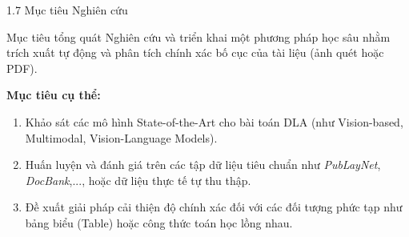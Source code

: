 \documentclass[aspectratio=1610,8pt]{beamer}
\begin{document}

\begin{frame}{1.7 \; Mục tiêu Nghiên cứu}
    \begin{block}{Mục tiêu tổng quát}
        Nghiên cứu và triển khai một phương pháp học sâu nhằm trích xuất tự động và phân tích chính xác bố cục của tài liệu (ảnh quét hoặc PDF).
    \end{block}

    \vspace{0.2cm}
    \textbf{Mục tiêu cụ thể:}
    \begin{enumerate}
        \item Khảo sát các mô hình State-of-the-Art cho bài toán DLA (như Vision-based, Multimodal, Vision-Language Models).
        \item Huấn luyện và đánh giá trên các tập dữ liệu tiêu chuẩn như \textit{PubLayNet}, \textit{DocBank},...,  hoặc dữ liệu thực tế tự thu thập.
        \item Đề xuất giải pháp cải thiện độ chính xác đối với các đối tượng phức tạp như bảng biểu (Table) hoặc công thức toán học lồng nhau.
    \end{enumerate}
\end{frame}
\end{document}
